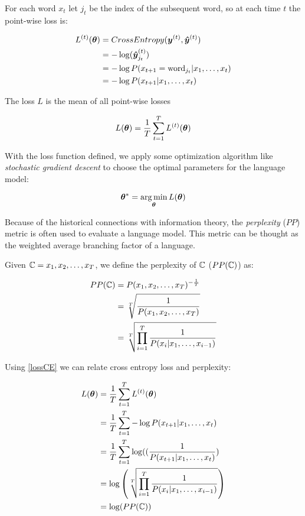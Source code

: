 For each word $x_t$ let $j_t$ be the index of the subsequent word, so at each time $t$ the point-wise loss is:

\begin{align}
\label{lossCE}
L^{(t)}(\bm{\theta}) &= CrossEntropy(\bm{y}^{(t)},\bm{\hat{y}}^{(t)})\\
    &= - \log({\bm{\hat{y}}^{(t)}}_{j_t})\\
        &= - \log P(x_{t+1} = \text{word}_{j_t}|x_{1}, \dots, x_{t})\\
        &= - \log P(x_{t+1}|x_{1}, \dots, x_{t})
\end{align}

The loss $L$ is the mean of all point-wise losses

\begin{equation}
L(\bm{\theta})=\frac{1}{T}\sum_{t=1}^{T}L^{(t)}(\bm{\theta})
\end{equation}

With the loss function defined, we apply some optimization algorithm like \textit{stochastic gradient descent} to choose the optimal parameters for the language model:

\begin{equation}
\bm{\theta}^{*} = \operatorname*{arg\,min}_{\bm{\theta}} L(\bm{\theta})
\end{equation}

Because of the historical connections with information theory, the \textit{perplexity} ($PP$) metric is often used to evaluate a language model. This metric can be thought as the weighted average branching factor of a language.

Given $\mathbb{C} = x_1, x_2, \dots, x_T$, we define the perplexity of $\mathbb{C}$ ($PP(\mathbb{C})$) as:

\begin{align}
PP(\mathbb{C}) &= P(x_1, x_2, \dots, x_T)^{-\frac{1}{T}}\\
      &= \sqrt[T]{\frac{1}{P(x_1, x_2, \dots, x_T)}}\\
      &= \sqrt[T]{\prod_{i=1}^{T}\frac{1}{P(x_i \vert x_1,\dots, x_{i-1})}}
\end{align}

Using \ref{lossCE} we can relate cross entropy loss and perplexity:

\begin{align}
        L(\bm{\theta}) &=\frac{1}{T} \sum_{t=1}^{T} L^{(t)}(\bm{\theta})\\
          &=\frac{1}{T} \sum_{t=1}^{T} - \log P(x_{t+1}|x_{1}, \dots, x_{t})\\
          &=\frac{1}{T} \sum_{t=1}^{T} \log ((\frac{1}{P(x_{t+1}|x_{1}, \dots, x_{t})})\\
          &= \log\left( \sqrt[T]{\prod_{i=1}^{T}\frac{1}{P(x_i \vert x_1,\dots, x_{i-1})}} \right)\\
          &= \log(PP(\mathbb{C}))
\end{align}

